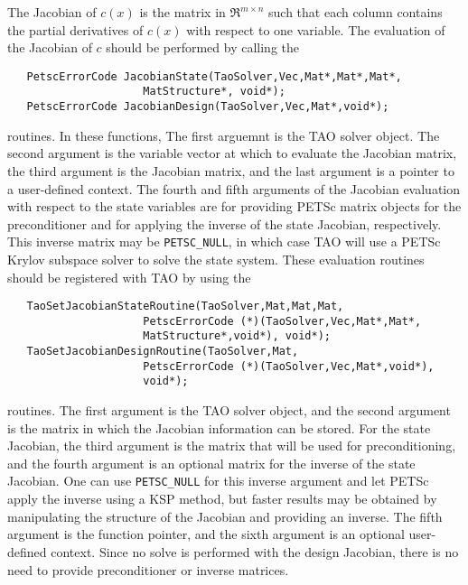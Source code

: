 The Jacobian of $c(x)$ is the matrix in $\Re^{m \times n}$ such that each 
column contains the partial derivatives of $c(x)$ with respect to one 
variable.  The evaluation of the Jacobian of $c$ should be performed 
by calling the 
\begin{verbatim}
   PetscErrorCode JacobianState(TaoSolver,Vec,Mat*,Mat*,Mat*,
                     MatStructure*, void*);
   PetscErrorCode JacobianDesign(TaoSolver,Vec,Mat*,void*);
\end{verbatim}
routines. 
In these functions, The first arguemnt is the TAO solver object.  The second 
argument is the variable vector at which to 
evaluate the Jacobian matrix, the third argument is the Jacobian matrix,
and the last argument is a pointer to a user-defined context. The fourth
and
fifth arguments of the Jacobian evaluation with respect to the state
variables
are for providing PETSc matrix objects for the preconditioner and for
applying
the inverse of the state Jacobian, respectively.  This inverse matrix may be 
{\tt PETSC\_NULL}, in which case TAO will use a PETSc Krylov subspace 
solver to solve the state system.  These evaluation routines should be 
registered 
with TAO by using the 
\begin{verbatim}
   TaoSetJacobianStateRoutine(TaoSolver,Mat,Mat,Mat,
                     PetscErrorCode (*)(TaoSolver,Vec,Mat*,Mat*,
                     MatStructure*,void*), void*);
   TaoSetJacobianDesignRoutine(TaoSolver,Mat,
                     PetscErrorCode (*)(TaoSolver,Vec,Mat*,void*), 
                     void*);
\end{verbatim}
routines. 
The first argument is the TAO solver object, and the second argument is the
matrix 
in which the Jacobian information can be stored.  For the state Jacobian,
the 
third argument is the matrix that will be used for preconditioning, and the 
fourth argument is an optional matrix for the inverse of the state
Jacobian.
One can use {\tt PETSC\_NULL} for this inverse argument and let PETSc
apply 
the inverse using a KSP method, but faster results may be obtained by
manipulating the structure of the Jacobian and providing an inverse.
The fifth argument is the function pointer, and the sixth argument is
an optional user-defined context.  Since no solve is performed with the
design Jacobian, there is no need to provide preconditioner or inverse
matrices.


